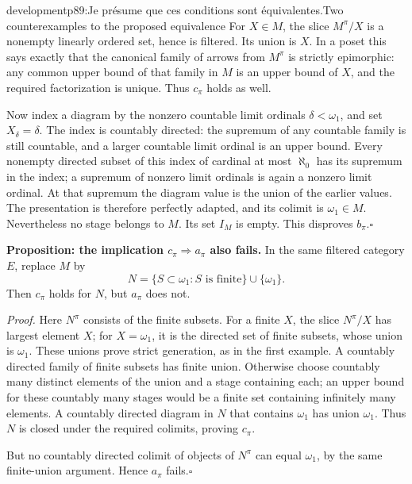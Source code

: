 \begin{dcomment}{development}{p89:Je présume que ces conditions sont équivalentes.}{Two counterexamples to the proposed equivalence}
For $X\in M$, the slice $M^\pi/X$ is a nonempty linearly ordered set, hence is filtered. Its union is $X$. In a poset this says exactly that the canonical family of arrows from $M^\pi$ is strictly epimorphic: any common upper bound of that family in $M$ is an upper bound of $X$, and the required factorization is unique. Thus $c_\pi$ holds as well.

Now index a diagram by the nonzero countable limit ordinals $\delta<\omega_1$, and set $X_\delta=\delta$. The index is countably directed: the supremum of any countable family is still countable, and a larger countable limit ordinal is an upper bound. Every nonempty directed subset of this index of cardinal at most $\aleph_0$ has its supremum in the index; a supremum of nonzero limit ordinals is again a nonzero limit ordinal. At that supremum the diagram value is the union of the earlier values. The presentation is therefore perfectly adapted, and its colimit is $\omega_1\in M$. Nevertheless no stage belongs to $M$. Its set $I_M$ is empty. This disproves $b_\pi$.\hfill$\square$

\textbf{Proposition: the implication $c_\pi\Rightarrow a_\pi$ also fails.}\ours
In the same filtered category $E$, replace $M$ by
\[
 N=\{S\subset\omega_1:S\text{ is finite}\}\cup\{\omega_1\}.
\]
Then $c_\pi$ holds for $N$, but $a_\pi$ does not.

\emph{Proof.} Here $N^\pi$ consists of the finite subsets. For a finite $X$, the slice $N^\pi/X$ has largest element $X$; for $X=\omega_1$, it is the directed set of finite subsets, whose union is $\omega_1$. These unions prove strict generation, as in the first example. A countably directed family of finite subsets has finite union. Otherwise choose countably many distinct elements of the union and a stage containing each; an upper bound for these countably many stages would be a finite set containing infinitely many elements. A countably directed diagram in $N$ that contains $\omega_1$ has union $\omega_1$. Thus $N$ is closed under the required colimits, proving $c_\pi$.

But no countably directed colimit of objects of $N^\pi$ can equal $\omega_1$, by the same finite-union argument. Hence $a_\pi$ fails.\hfill$\square$


\end{dcomment}
